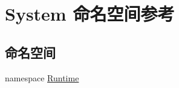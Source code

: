 \hypertarget{namespace_system}{}\section{System 命名空间参考}
\label{namespace_system}
\subsection*{命名空间}
\begin{DoxyCompactItemize}
\item 
namespace \hyperlink{namespace_system_1_1_runtime}{Runtime}
\end{DoxyCompactItemize}
